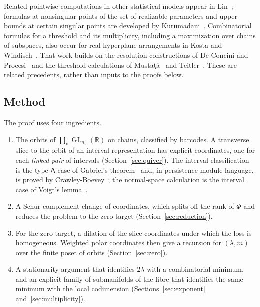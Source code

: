 \documentclass[11pt,a4paper]{article}
\theoremstyle{definition}
\theoremstyle{remark}
\numberwithin{equation}{section}
\newcommand{\R}{\mathbb{R}}
\newcommand{\GL}{\operatorname{GL}}
\begin{document}
Related pointwise computations in other statistical models appear in Lin~\cite[Section~5]{lin}; formulas at nonsingular points of the set of realizable parameters and upper bounds at certain singular points are developed by Kurumadani~\cite{kurumadani,kurumadani-upper}. Combinatorial formulas for a threshold and its multiplicity, including a maximization over chains of subspaces, also occur for real hyperplane arrangements in Kosta and Windisch~\cite[Theorem~4.2 and Corollary~4.4]{kosta-windisch}. That work builds on the resolution constructions of De Concini and Procesi~\cite{deconcini-procesi} and the threshold calculations of Mustaţă~\cite{mustata-arrangements} and Teitler~\cite{teitler}. These are related precedents, rather than inputs to the proofs below.

\subsection{Method}
The proof uses four ingredients.
\begin{enumerate}[label=(\roman*)]
\item The orbits of $\prod_v\GL_{n_v}(\R)$ on chains, classified by barcodes. A transverse slice to the orbit of an interval representation has explicit coordinates, one for each \emph{linked pair} of intervals (Section~\ref{sec:quiver}). The interval classification is the type-$\mathsf A$ case of Gabriel's theorem~\cite{gabriel} and, in persistence-module language, is proved by Crawley-Boevey~\cite{crawley-boevey}; the normal-space calculation is the interval case of Voigt's lemma~\cite{voigt}.
\item A Schur-complement change of coordinates, which splits off the rank of $\Phi$ and reduces the problem to the zero target (Section~\ref{sec:reduction}).
\item For the zero target, a dilation of the slice coordinates under which the loss is homogeneous. Weighted polar coordinates then give a recursion for $(\lambda,m)$ over the finite poset of orbits (Section~\ref{sec:zero}).
\item A stationarity argument that identifies $2\lambda$ with a combinatorial minimum, and an explicit family of submanifolds of the fibre that identifies the same minimum with the local codimension (Sections~\ref{sec:exponent} and~\ref{sec:multiplicity}).
\end{enumerate}
\end{document}
